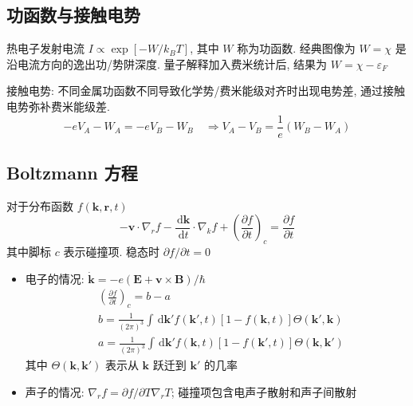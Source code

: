 \documentclass[11pt,a4paper]{article}%
\numberwithin{equation}{section}%
\renewcommand*{\vec}[1]{\bm{#1}}%
\newcommand{\dif}{\,\mathrm d}
\begin{document}
\subsection{功函数与接触电势} %
\label{sub:work_func}
热电子发射电流 $I\propto \exp[-W/k_BT]$, 其中 $W$ 称为功函数. 经典图像为 $W = \chi$ 是沿电流方向的逸出功/势阱深度. 量子解释加入费米统计后, 结果为 $W = \chi - \varepsilon_F$

接触电势: 不同金属功函数不同导致化学势/费米能级对齐时出现电势差, 通过接触电势弥补费米能级差. 
\begin{equation}
	-e V_A - W_A = -e V_B - W_B\quad\Rightarrow V_A - V_B = \frac 1e(W_B - W_A)
\end{equation}
\subsection{Boltzmann 方程} %
\label{sub:boltzmann_equ}
对于分布函数 $f(\vec k,\vec r, t)$
\begin{equation}
	-\vec v\cdot\nabla_r f -\frac{\dif\vec k}{\dif t}\cdot\nabla_k f + \left(\frac{\partial f}{\partial t}\right)_c = \frac{\partial f}{\partial t}
\end{equation}
其中脚标 $c$ 表示碰撞项. 稳态时 $\partial f/ \partial t = 0$
\begin{itemize}
	\item 电子的情况: $\dot{\vec k} = -e\left(\vec E + \vec v\times\vec B\right)/\hbar$
	\begin{align}
		&\left(\frac{\partial f}{\partial t}\right)_c = b-a \\
		&b = \frac 1{(2\pi)^3}\int\dif\vec k' f(\vec k', t)[1-f(\vec k, t)]\Theta(\vec k', \vec k) \\
		&a = \frac 1{(2\pi)^3}\int\dif\vec k' f(\vec k, t)[1-f(\vec k', t)]\Theta(\vec k, \vec k')
	\end{align}
	其中 $\Theta(\vec k, \vec k')$ 表示从 $\vec k$ 跃迁到 $\vec k'$ 的几率
	\item 声子的情况: $\nabla_r f = \partial f/\partial T \nabla_r T$; 碰撞项包含电声子散射和声子间散射
\end{itemize}
\end{document}

